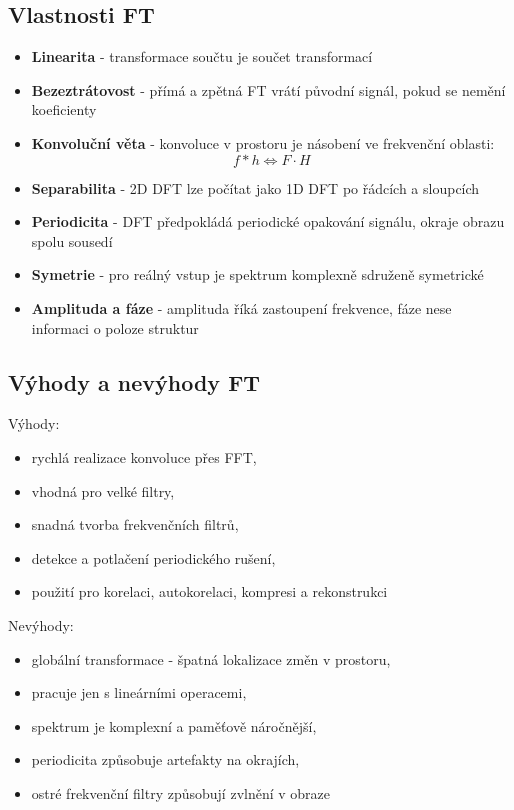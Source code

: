 \subsection*{Vlastnosti FT}
\begin{itemize}
    \item \textbf{Linearita} - transformace součtu je součet transformací
    \item \textbf{Bezeztrátovost} - přímá a zpětná FT vrátí původní signál, pokud se nemění koeficienty
    \item \textbf{Konvoluční věta} - konvoluce v prostoru je násobení ve frekvenční oblasti:
          \begin{equation}
              f*h \Longleftrightarrow F\cdot H
          \end{equation}
    \item \textbf{Separabilita} - 2D DFT lze počítat jako 1D DFT po řádcích a sloupcích
    \item \textbf{Periodicita} - DFT předpokládá periodické opakování signálu, okraje obrazu spolu sousedí
    \item \textbf{Symetrie} - pro reálný vstup je spektrum komplexně sdruženě symetrické
    \item \textbf{Amplituda a fáze} - amplituda říká zastoupení frekvence, fáze nese informaci o poloze struktur
\end{itemize}

\subsection*{Výhody a nevýhody FT}
Výhody:
\begin{itemize}
    \item rychlá realizace konvoluce přes FFT,
    \item vhodná pro velké filtry,
    \item snadná tvorba frekvenčních filtrů,
    \item detekce a potlačení periodického rušení,
    \item použití pro korelaci, autokorelaci, kompresi a rekonstrukci
\end{itemize}
Nevýhody:
\begin{itemize}
    \item globální transformace - špatná lokalizace změn v prostoru,
    \item pracuje jen s lineárními operacemi,
    \item spektrum je komplexní a paměťově náročnější,
    \item periodicita způsobuje artefakty na okrajích,
    \item ostré frekvenční filtry způsobují zvlnění v obraze
\end{itemize}

